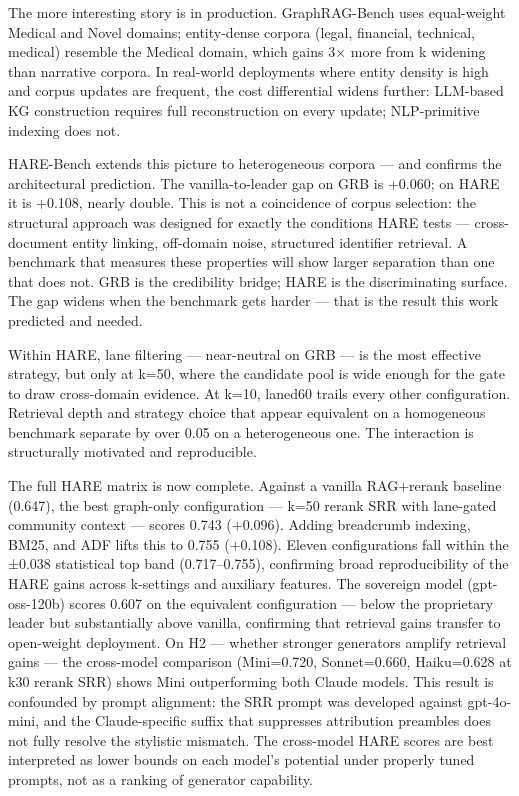The more interesting story is in production. GraphRAG-Bench uses equal-weight Medical and Novel domains; entity-dense corpora (legal, financial, technical, medical) resemble the Medical domain, which gains 3× more from k widening than narrative corpora. In real-world deployments where entity density is high and corpus updates are frequent, the cost differential widens further: LLM-based KG construction requires full reconstruction on every update; NLP-primitive indexing does not.

HARE-Bench extends this picture to heterogeneous corpora --- and confirms the architectural prediction. The vanilla-to-leader gap on GRB is +0.060; on HARE it is +0.108, nearly double. This is not a coincidence of corpus selection: the structural approach was designed for exactly the conditions HARE tests --- cross-document entity linking, off-domain noise, structured identifier retrieval. A benchmark that measures these properties will show larger separation than one that does not. GRB is the credibility bridge; HARE is the discriminating surface. The gap widens when the benchmark gets harder --- that is the result this work predicted and needed.

Within HARE, lane filtering --- near-neutral on GRB --- is the most effective strategy, but only at k=50, where the candidate pool is wide enough for the gate to draw cross-domain evidence. At k=10, laned60 trails every other configuration. Retrieval depth and strategy choice that appear equivalent on a homogeneous benchmark separate by over 0.05 on a heterogeneous one. The interaction is structurally motivated and reproducible.

The full HARE matrix is now complete. Against a vanilla RAG+rerank baseline (0.647), the best graph-only configuration --- k=50 rerank SRR with lane-gated community context --- scores 0.743 (+0.096). Adding breadcrumb indexing, BM25, and ADF lifts this to 0.755 (+0.108). Eleven configurations fall within the ±0.038 statistical top band (0.717--0.755), confirming broad reproducibility of the HARE gains across k-settings and auxiliary features. The sovereign model (gpt-oss-120b) scores 0.607 on the equivalent configuration --- below the proprietary leader but substantially above vanilla, confirming that retrieval gains transfer to open-weight deployment. On H2 --- whether stronger generators amplify retrieval gains --- the cross-model comparison (Mini=0.720, Sonnet=0.660, Haiku=0.628 at k30 rerank SRR) shows Mini outperforming both Claude models. This result is confounded by prompt alignment: the SRR prompt was developed against gpt-4o-mini, and the Claude-specific suffix that suppresses attribution preambles does not fully resolve the stylistic mismatch. The cross-model HARE scores are best interpreted as lower bounds on each model's potential under properly tuned prompts, not as a ranking of generator capability.

